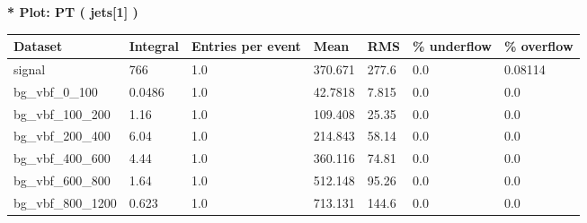 \documentclass[a4paper, 10pt]{article}
\begin{document}
\textbf{* Plot: PT ( jets[1] ) }\\
   \begin{table}[H]
  \begin{center}
    \begin{tabular}{|m{23.0mm}|m{23.0mm}|m{18.0mm}|m{19.0mm}|m{19.0mm}|m{19.0mm}|m{19.0mm}|}
      \hline
      {\cellcolor{yellow}         Dataset}& {\cellcolor{yellow}         Integral}& {\cellcolor{yellow}         Entries per event}& {\cellcolor{yellow}         Mean}& {\cellcolor{yellow}         RMS}& {\cellcolor{yellow}         \% underflow}& {\cellcolor{yellow}         \% overflow}\\
      \hline
      {\cellcolor{white}         signal}& {\cellcolor{white}         766}& {\cellcolor{white}         1.0}& {\cellcolor{white}         370.671}& {\cellcolor{white}         277.6}& {\cellcolor{green}         0.0}& {\cellcolor{green}         0.08114}\\
      \hline
      {\cellcolor{white}         bg\_vbf\_0\_100}& {\cellcolor{white}         0.0486}& {\cellcolor{white}         1.0}& {\cellcolor{white}         42.7818}& {\cellcolor{white}         7.815}& {\cellcolor{green}         0.0}& {\cellcolor{green}         0.0}\\
      \hline
      {\cellcolor{white}         bg\_vbf\_100\_200}& {\cellcolor{white}         1.16}& {\cellcolor{white}         1.0}& {\cellcolor{white}         109.408}& {\cellcolor{white}         25.35}& {\cellcolor{green}         0.0}& {\cellcolor{green}         0.0}\\
      \hline
      {\cellcolor{white}         bg\_vbf\_200\_400}& {\cellcolor{white}         6.04}& {\cellcolor{white}         1.0}& {\cellcolor{white}         214.843}& {\cellcolor{white}         58.14}& {\cellcolor{green}         0.0}& {\cellcolor{green}         0.0}\\
      \hline
      {\cellcolor{white}         bg\_vbf\_400\_600}& {\cellcolor{white}         4.44}& {\cellcolor{white}         1.0}& {\cellcolor{white}         360.116}& {\cellcolor{white}         74.81}& {\cellcolor{green}         0.0}& {\cellcolor{green}         0.0}\\
      \hline
      {\cellcolor{white}         bg\_vbf\_600\_800}& {\cellcolor{white}         1.64}& {\cellcolor{white}         1.0}& {\cellcolor{white}         512.148}& {\cellcolor{white}         95.26}& {\cellcolor{green}         0.0}& {\cellcolor{green}         0.0}\\
      \hline
      {\cellcolor{white}         bg\_vbf\_800\_1200}& {\cellcolor{white}         0.623}& {\cellcolor{white}         1.0}& {\cellcolor{white}         713.131}& {\cellcolor{white}         144.6}& {\cellcolor{green}         0.0}& {\cellcolor{green}         0.0}\\

\end{tabular}
\end{center}
\end{table}
\end{document}

